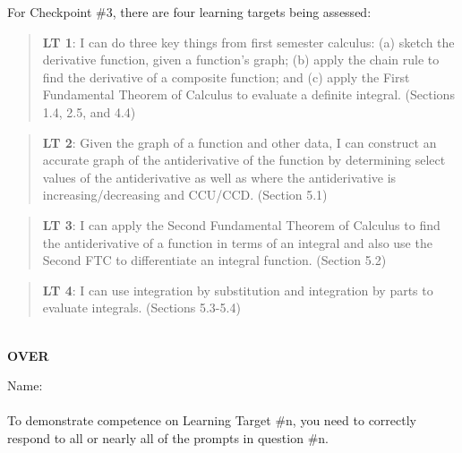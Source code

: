\documentclass[11 pt]{article}
\begin{document}
 For Checkpoint \#3, there are four learning targets being assessed: 

\begin{quote}
{\bf LT 1}: I can do three key things from first semester calculus: (a) sketch the derivative function, given a function’s graph; (b) apply the chain rule to find the derivative of a composite function; and (c) apply the First Fundamental Theorem of Calculus to evaluate a definite integral. (Sections 1.4, 2.5, and 4.4)
\end{quote}

\begin{quote}
{\bf LT 2}: Given the graph of a function and other data, I can construct an accurate graph of the antiderivative of the function by determining select values of the antiderivative as well as where the antiderivative is increasing/decreasing and CCU/CCD.
(Section 5.1)
\end{quote}

\begin{quote}
{\bf LT 3}: I can apply the Second Fundamental Theorem of Calculus to find the antiderivative of a function in terms of an integral and also use the Second FTC to differentiate an integral function. (Section 5.2)
\end{quote}


\begin{quote}
{\bf LT 4}: I can use integration by substitution and integration by parts to evaluate integrals. (Sections 5.3-5.4)
\end{quote}

\noindent \hrulefill \\

\vfill \hfill {\bf OVER} 

\pagebreak

\noindent Name: \\ \ \\

\noindent To demonstrate competence on Learning Target \#n, you need to correctly respond to all or nearly all of the prompts in question \#n.  
\end{document}
